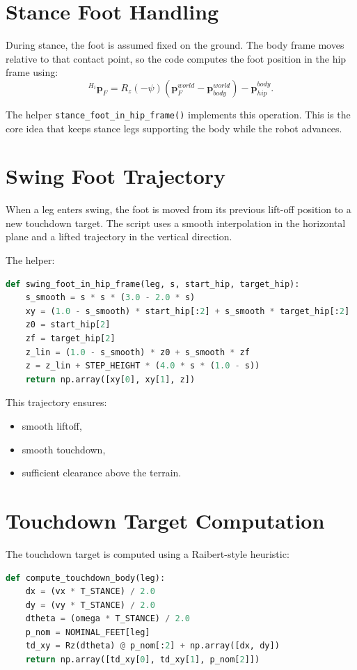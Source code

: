 \documentclass[11pt,a4paper]{report}
\begin{document}
\section{Stance Foot Handling}

During stance, the foot is assumed fixed on the ground. The body frame moves relative to that contact point, so the code computes the foot position in the hip frame using:
\[
{}^{H_i}\mathbf{p}_F = R_z(-\psi)\left(\mathbf{p}_F^{world} - \mathbf{p}_{body}^{world}\right) - \mathbf{p}_{hip}^{body}.
\]

The helper \texttt{stance\_foot\_in\_hip\_frame()} implements this operation. This is the core idea that keeps stance legs supporting the body while the robot advances.

\section{Swing Foot Trajectory}

When a leg enters swing, the foot is moved from its previous lift-off position to a new touchdown target. The script uses a smooth interpolation in the horizontal plane and a lifted trajectory in the vertical direction.

The helper:
\begin{lstlisting}[language=Python]
def swing_foot_in_hip_frame(leg, s, start_hip, target_hip):
    s_smooth = s * s * (3.0 - 2.0 * s)
    xy = (1.0 - s_smooth) * start_hip[:2] + s_smooth * target_hip[:2]
    z0 = start_hip[2]
    zf = target_hip[2]
    z_lin = (1.0 - s_smooth) * z0 + s_smooth * zf
    z = z_lin + STEP_HEIGHT * (4.0 * s * (1.0 - s))
    return np.array([xy[0], xy[1], z])
\end{lstlisting}

This trajectory ensures:
\begin{itemize}
    \item smooth liftoff,
    \item smooth touchdown,
    \item sufficient clearance above the terrain.
\end{itemize}

\section{Touchdown Target Computation}

The touchdown target is computed using a Raibert-style heuristic:
\begin{lstlisting}[language=Python]
def compute_touchdown_body(leg):
    dx = (vx * T_STANCE) / 2.0
    dy = (vy * T_STANCE) / 2.0
    dtheta = (omega * T_STANCE) / 2.0
    p_nom = NOMINAL_FEET[leg]
    td_xy = Rz(dtheta) @ p_nom[:2] + np.array([dx, dy])
    return np.array([td_xy[0], td_xy[1], p_nom[2]])
\end{lstlisting}
\end{document}
